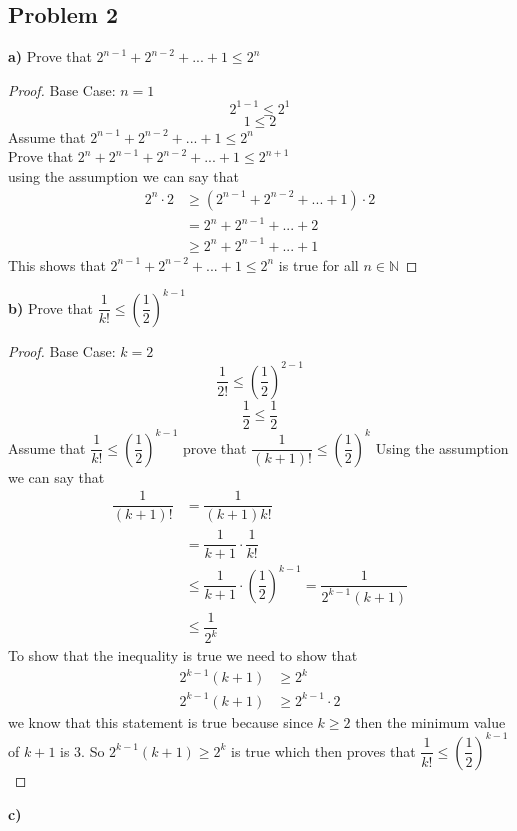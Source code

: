 \documentclass[12pt]{article}
\newcommand{\N}{\mathbb{N}}
\begin{document}
\subsection*{Problem 2}
\textbf{a)} Prove that $2^{n-1} + 2^{n-2} + ... + 1 \leq 2^n$
\begin{proof}
Base Case: $n = 1$
\[ 2^{1-1} \leq 2^1 \]
\[ 1 \leq 2 \]
Assume that $2^{n-1} + 2^{n-2} + ... + 1 \leq 2^n$ \\
Prove that $2^n + 2^{n-1} + 2^{n-2} + ... + 1 \leq 2^{n+1}$ \\
using the assumption we can say that
\begin{align*}
2^n \cdot 2 &\geq (2^{n-1} + 2^{n-2} + ... + 1) \cdot 2 \\
&= 2^n + 2^{n-1} + ... + 2 \\
&\geq 2^n + 2^{n-1} + ... + 1
\end{align*}
This shows that $2^{n-1} + 2^{n-2} + ... + 1 \leq 2^n$ is true for all $n \in \N$
\end{proof}
\textbf{b) } Prove that $\dfrac{1}{k!} \leq \left(  \dfrac{1}{2} \right) ^{k-1}$
\begin{proof}
Base Case: $k = 2$
\[ \dfrac{1}{2!} \leq \left( \dfrac{1}{2} \right) ^{2-1} \]
\[ \dfrac{1}{2} \leq \dfrac{1}{2} \]
Assume that $\dfrac{1}{k!} \leq \left(  \dfrac{1}{2} \right) ^{k-1}$ prove that $\dfrac{1}{(k+1)!} \leq \left(  \dfrac{1}{2} \right) ^{k}$
Using the assumption we can say that
\begin{align*}
\dfrac{1}{(k+1)!} &= \dfrac{1}{(k+1)k!} \\
&= \dfrac{1}{k+1} \cdot \dfrac{1}{k!} \\
&\leq \dfrac{1}{k+1} \cdot \left(  \dfrac{1}{2} \right)^{k-1} = \dfrac{1}{2^{k-1}(k+1)}\\
&\leq \dfrac{1}{2^k}
\end{align*}
To show that the inequality is true we need to show that 
\begin{align*}
2^{k-1}(k+1) &\geq 2^k \\
2^{k-1}(k+1) &\geq 2^{k-1} \cdot 2
\end{align*}
we know that this statement is true because since $k \geq 2$ then the minimum value of $k+1$ is 3. So $2^{k-1}(k+1) \geq 2^k$ is true which then proves that $\dfrac{1}{k!} \leq \left(  \dfrac{1}{2} \right) ^{k-1}$
\end{proof}
\newpage
\textbf{c)}
\end{document}
